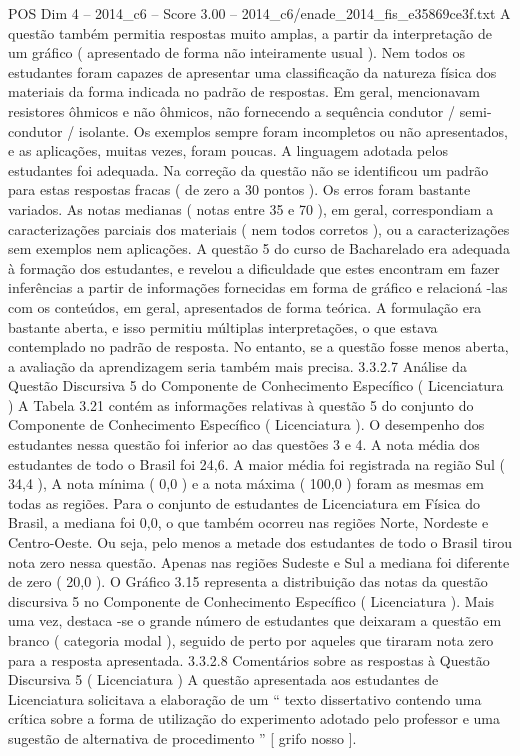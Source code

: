 \begin{textsample}{POS Dim 4 – 2014\_c6 – Score 3.00 – 2014\_c6/enade\_2014\_fis\_e35869ce3f.txt}
A questão também permitia respostas muito amplas, a partir da interpretação de um gráfico ( apresentado de forma não inteiramente usual ).
Nem todos os estudantes foram capazes de apresentar uma classificação da natureza física dos materiais da forma indicada no padrão de respostas.
Em geral, mencionavam resistores ôhmicos e não ôhmicos, não fornecendo a sequência condutor / semi-condutor / isolante.
Os exemplos sempre foram incompletos ou não apresentados, e as aplicações, muitas vezes, foram poucas.
A linguagem adotada pelos estudantes foi adequada.
Na correção da questão não se identificou um padrão para estas respostas fracas ( de zero a 30 pontos ).
Os erros foram bastante variados.
As notas medianas ( notas entre 35 e 70 ), em geral, correspondiam a caracterizações parciais dos materiais ( nem todos corretos ), ou a caracterizações sem exemplos nem aplicações.
A questão 5 do curso de Bacharelado era adequada à formação dos estudantes, e revelou a dificuldade que estes encontram em fazer inferências a partir de informações fornecidas em forma de gráfico e relacioná -las com os conteúdos, em geral, apresentados de forma teórica.
A formulação era bastante aberta, e isso permitiu múltiplas interpretações, o que estava contemplado no padrão de resposta.
No entanto, se a questão fosse menos aberta, a avaliação da aprendizagem seria também mais precisa. 3.3.2.7 Análise da Questão Discursiva 5 do Componente de Conhecimento Específico ( Licenciatura ) A Tabela 3.21 contém as informações relativas à questão 5 do conjunto do Componente de Conhecimento Específico ( Licenciatura ).
O desempenho dos estudantes nessa questão foi inferior ao das questões 3 e 4.
A nota média dos estudantes de todo o Brasil foi 24,6.
A maior média foi registrada na região Sul ( 34,4 ), A nota mínima ( 0,0 ) e a nota máxima ( 100,0 ) foram as mesmas em todas as regiões.
Para o conjunto de estudantes de Licenciatura em Física do Brasil, a mediana foi 0,0, o que também ocorreu nas regiões Norte, Nordeste e Centro-Oeste.
Ou seja, pelo menos a metade dos estudantes de todo o Brasil tirou nota zero nessa questão.
Apenas nas regiões Sudeste e Sul a mediana foi diferente de zero ( 20,0 ).
O Gráfico 3.15 representa a distribuição das notas da questão discursiva 5 no Componente de Conhecimento Específico ( Licenciatura ).
Mais uma vez, destaca -se o grande número de estudantes que deixaram a questão em branco ( categoria modal ), seguido de perto por aqueles que tiraram nota zero para a resposta apresentada. 3.3.2.8 Comentários sobre as respostas à Questão Discursiva 5 ( Licenciatura ) A questão apresentada aos estudantes de Licenciatura solicitava a elaboração de um “ texto dissertativo contendo uma crítica sobre a forma de utilização do experimento adotado pelo professor e uma sugestão de alternativa de procedimento ” [ grifo nosso ].

\end{textsample}
